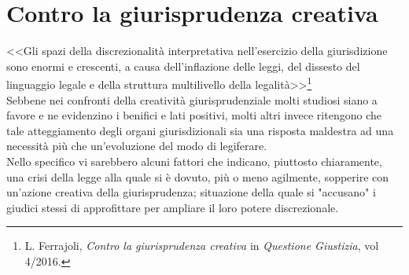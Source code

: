 \section{Contro la giurisprudenza creativa}
<<Gli spazi della discrezionalità interpretativa nell’esercizio della giurisdizione sono enormi e crescenti, a causa dell’inflazione delle leggi, del dissesto del linguaggio legale e della struttura multilivello della legalità>>\footnote{L. Ferrajoli, \textit{Contro la giurisprudenza creativa} in \textit{Questione Giustizia}, vol 4/2016.}
\\Sebbene nei confronti della creatività giurisprudenziale molti studiosi siano a favore e ne evidenzino i benifici e lati positivi, molti altri invece ritengono che tale atteggiamento degli organi giurisdizionali sia una risposta maldestra ad una necessità più che un'evoluzione del modo di legiferare.
\\Nello specifico vi sarebbero alcuni fattori che indicano, piuttosto chiaramente, una crisi della legge alla quale si è dovuto, più o meno agilmente, sopperire con un'azione creativa della giurisprudenza; situazione della quale si "accusano" i giudici stessi di approfittare per ampliare il loro potere discrezionale.

